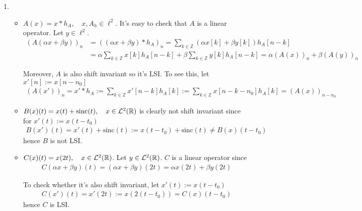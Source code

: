 \documentclass{article}
\begin{document}
    
    \begin{enumerate}[label=(\roman*)]
        \item
        \begin{itemize}
            \item $A(x)=x * h_A, \quad x, A_h\in \ell^2$. It's easy to check that $A$ is a linear operator. Let $y\in \ell^2$. 
            \begin{align}
                (A(\alpha x + \beta y))_n&=((\alpha x + \beta y) * h_A)_n = \sum_{k\in \mathbb{Z}} (\alpha x[k] + \beta y[k]) h_A[n-k]\\
                &=\alpha \sum_{k\in \mathbb{Z}} x[k]h_A[n-k] + \beta \sum_{k\in \mathbb{Z}} y[k] h_A[n-k] = \alpha (A(x))_n + \beta (A(y))_n
            \end{align}
            
            Moreover, $A$ is also shift invariant so it's LSI. To see this, let $x'[n]:=x[n-n_0]$
            \begin{align}
                (A(x'))_n= x' * h_A := \sum_{k\in \mathbb{Z}} x'[n-k] h_A[k] := \sum_{k\in \mathbb{Z}} x[n-k-n_0] h_A[k] = (A(x))_{n-n_0}
            \end{align}
            \item $B(x)(t)=x(t)+\text{sinc}(t),\quad x\in \mathcal{L}^2(\mathbb{R})$ is clearly not shift invariant since for $x'(t):=x(t-t_0)$
            \begin{align}
                B(x')(t)=x'(t)+\text{sinc}(t):=x(t-t_0)+\text{sinc}(t)\neq B(x)(t-t_0)
            \end{align}
            hence $B$ is not LSI.
            
            \item $C(x)(t)=x(2t),\quad x \in \mathcal{L}^2(\mathbb{R})$. Let $y\in \mathcal{L}^2(\mathbb{R})$. $C$ is a linear operator since
            \begin{align}
                C(\alpha x + \beta y)(t) = (\alpha x + \beta y)(2t) = \alpha x(2t) + \beta y(2t)
            \end{align}
            
            To check whether it's also shift invariant, let $x'(t):=x(t-t_0)$
            \begin{align}
                C(x')(t) = x'(2t) := x(2(t-t_0))=C(x)(t-t_0)
            \end{align}
            hence $C$ is LSI.
            

\end{itemize}
\end{enumerate}
\end{document}
